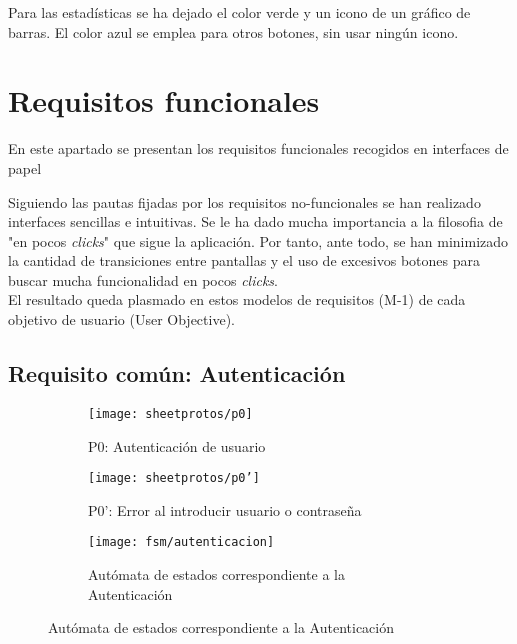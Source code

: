 Para las estadísticas se ha dejado el color verde y un icono de un gráfico de barras. El color azul se emplea para otros botones, sin usar ningún icono.\\

\section{Requisitos funcionales}
\label{analisis-de-requisitos:funcionales}

En este apartado se presentan los requisitos funcionales recogidos en interfaces de papel

Siguiendo las pautas fijadas por los requisitos no-funcionales se han realizado interfaces sencillas e intuitivas. Se le ha dado mucha importancia a la filosofia de "en pocos \textit{clicks}" que sigue la aplicación. Por tanto, ante todo, se han minimizado la cantidad de transiciones entre pantallas y el uso de excesivos botones para buscar mucha funcionalidad en pocos \textit{clicks}.\\

El resultado queda plasmado en estos modelos de requisitos (M-1) de cada objetivo de usuario (User Objective).\\

\subsection{Requisito común: Autenticación}
\label{analisis-de-requisitos:funcionales:p1}

\begin{figure}[H]
\begin{subfigure}[b]{0.5\textwidth}
	\centering
	\texttt{[image: sheetprotos/p0]}
	\caption{P0: Autenticación de usuario}
	\label{fig:req-autenticacion:p0}
\end{subfigure}
%
\begin{subfigure}[b]{0.5\textwidth}
	\centering
	\texttt{[image: sheetprotos/p0']}
	\caption{P0': Error al introducir usuario o contraseña}
	\label{fig:req-autenticacion:p0'}
\end{subfigure}
%
\begin{subfigure}[b]{0.9\textwidth}
	\centering
	\texttt{[image: fsm/autenticacion]}
	\caption{Autómata de estados correspondiente a la Autenticación}
	\label{fig:fsm-autenticacion}
\end{subfigure}

\label{fig:autenticacion}
\end{figure}

